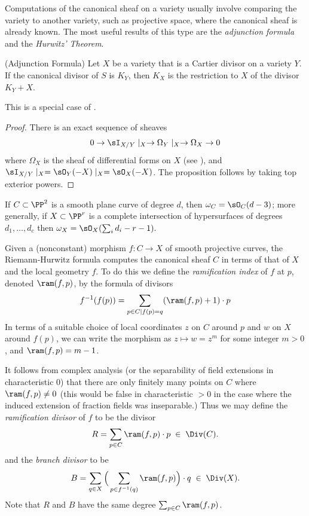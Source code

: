 Computations of the canonical sheaf on a variety usually involve comparing the variety to another variety, such as projective space, where the canonical sheaf is already known. The most useful results of this type are  the \emph{adjunction formula}
and the \emph{Hurwitz' Theorem}.

\begin{proposition}\label{adjunction}(Adjunction Formula)
 Let $X$ be a variety that is a Cartier divisor on a variety $Y$. If the canonical divisor of $S$ is $K_{Y}$, then
 $K_{X}$ is the restriction to $X$ of the divisor $K_{Y}+X$.
\end{proposition}
This is a special case of \cite[****]{H}.
\begin{proof}
 There is an exact sequence of sheaves
 $$
0\to  \sI_{X/Y}\mid_{X} \to \Omega_{Y}\mid _{X} \to \Omega_{X} \to 0
 $$
 where $\Omega_{X}$ is the sheaf of differential forms on $X$ (see \cite[Theorem ***]{Eisenbud95}), and
$ \sI_{X/Y}\mid_{X} = \sO_{Y}(-X)\mid_{X} = \sO_{X}(-X)$. The proposition follows by taking top exterior powers.
\end{proof}

\begin{corollary}\label{canonical of plane curve}
If $C\subset \PP^{2}$ is a smooth plane curve of degree $d$, then $\omega_{C} = \sO_{C}(d-3)$; more generally, if
$X\subset \PP^{r}$ is a complete intersection of hypersurfaces of degrees $d_{1},\dots, d_{c}$ then
$\omega_{X} = \sO_{X}(\sum_{i}d_{i }-r-1).$
\end{corollary}

 Given a (nonconstant) morphism $f : C \to X$ of smooth projective curves, the Riemann-Hurwitz formula computes the canonical sheaf  $C$ in terms of that of  $X$ and the local geometry $f$. To do this we define the
\emph{ramification index} of $f$ at $p$,  denoted $\ram(f,p)$, by the formula of divisors
$$
 f^{-1}(f(p)) = \sum_{p\in C \mid f(p)=q} (\ram(f,p)+1)\cdot p
 $$
In terms of a suitable choice of local coordinates $z$ on $C$ around $p$ and $w$ on $X$ around $f(p)$, we can write the morphism as $z \mapsto w = z^m$ for some integer $m > 0$, and $\ram(f,p) = m-1$.

It follows from complex analysis (or the separability of field extensions in characteristic 0) that there are only finitely many
points on $C$ where $\ram(f,p) \neq 0$ (this would be false in characteristic $>0$ in the case where the
induced extension of fraction fields was inseparable.) Thus we may define the \emph{ramification divisor} of $f$ to be the divisor
 $$
 R = \sum_{p \in C} \ram(f,p)\cdot p \; \in \;  \Div(C).
 $$
 and the \emph{branch divisor} to be
 $$
 B = \sum_{q \in X} \Big(\sum_{p \in f^{-1}(q)} \ram(f,p) \Big)\cdot q \; \in \; \Div(X).
 $$
 Note that $R$ and $B$ have the same degree $\sum_{p \in C} \ram(f,p)$. 

